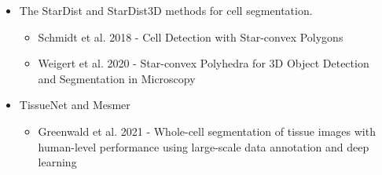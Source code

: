 \documentclass[9pt, aspectratio=169]{beamer}
\begin{document}
\begin{frame}
\begin{columns}
\begin{column}{0.8\textwidth}
            \vspace{1em}
            \begin{itemize}
                \item The StarDist and StarDist3D methods for cell segmentation.
                      \begin{itemize}
                          \item Schmidt et al. 2018 - Cell Detection with Star-convex Polygons
                          \item Weigert et al. 2020 - Star-convex Polyhedra for 3D Object Detection and Segmentation in Microscopy
                      \end{itemize}
                \item TissueNet and Mesmer
                      \begin{itemize}
                          \item Greenwald et al. 2021 - Whole-cell segmentation of tissue images with human-level performance using large-scale data annotation and deep learning
                      \end{itemize}
            \end{itemize}
        \end{column}
        \begin{column}{0.2\textwidth}

\end{column}
\end{columns}
\end{frame}
\end{document}

